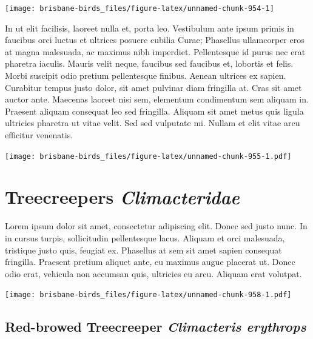 \documentclass[]{book}
\let\origfigure\figure
\let\endorigfigure\endfigure
\renewenvironment{figure}[1][2] {
  \expandafter\origfigure\expandafter[H]
} {
  \endorigfigure
}
\begin{document}
\begin{figure}
\texttt{[image: brisbane-birds\_files/figure-latex/unnamed-chunk-954-1]} \caption{insert figure caption}\label{fig:unnamed-chunk-954}
\end{figure}

In ut elit facilisis, laoreet nulla et, porta leo. Vestibulum ante ipsum
primis in faucibus orci luctus et ultrices posuere cubilia Curae;
Phasellus ullamcorper eros at magna malesuada, ac maximus nibh
imperdiet. Pellentesque id purus nec erat pharetra iaculis. Mauris velit
neque, faucibus sed faucibus et, lobortis et felis. Morbi suscipit odio
pretium pellentesque finibus. Aenean ultrices ex sapien. Curabitur
tempus justo dolor, sit amet pulvinar diam fringilla at. Cras sit amet
auctor ante. Maecenas laoreet nisi sem, elementum condimentum sem
aliquam in. Praesent aliquam consequat leo sed fringilla. Aliquam sit
amet metus quis ligula ultricies pharetra ut vitae velit. Sed sed
vulputate mi. Nullam et elit vitae arcu efficitur venenatis.

\begin{figure}
\centering
\texttt{[image: brisbane-birds\_files/figure-latex/unnamed-chunk-955-1.pdf]}
\caption{\label{fig:unnamed-chunk-955}insert figure caption}
\end{figure}

\chapter{\texorpdfstring{Treecreepers
\emph{Climacteridae}}{Treecreepers Climacteridae}}\label{treecreepers-climacteridae}

Lorem ipsum dolor sit amet, consectetur adipiscing elit. Donec sed justo
nunc. In in cursus turpis, sollicitudin pellentesque lacus. Aliquam et
orci malesuada, tristique justo quis, feugiat ex. Phasellus at sem sit
amet sapien consequat fringilla. Praesent pretium aliquet ante, eu
maximus augue placerat ut. Donec odio erat, vehicula non accumsan quis,
ultricies eu arcu. Aliquam erat volutpat.

\texttt{[image: brisbane-birds\_files/figure-latex/unnamed-chunk-958-1.pdf]}

\section{\texorpdfstring{Red-browed Treecreeper \emph{Climacteris
erythrops}}{Red-browed Treecreeper Climacteris erythrops}}\label{red-browed-treecreeper-climacteris-erythrops}
\end{document}
